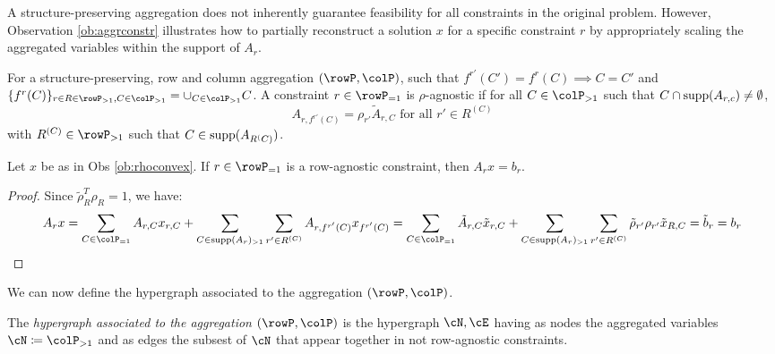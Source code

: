 {A structure-preserving aggregation does not inherently guarantee feasibility for all constraints in the original problem. However, Observation \ref{ob:aggrconstr} illustrates how to partially reconstruct a solution \(x\) for a specific constraint \(r\) by appropriately scaling the aggregated variables within the support of \(A_r\). 

\begin{definition}
  For a structure-preserving, row and column aggregation \((\rowP,\colP)\), such that \(f^{r'}(C') = f^r(C) \implies C=C'\) and \\ \(\{f^r(C)\}_{r\in R \in \rowP_{>1}, C \in \colP_{>1}} = \cup_{C \in \colP_{>1}}C\).
  A constraint \(r \in \rowP_{=1}\) is \(\rho\)-agnostic if for all \(C \in \colP_{>1}\) such that \(C \cap \operatorname{supp}(A_{r,c}) \neq \emptyset\), 
  \[A_{r,f^{r'}(C)} = \rho_{r'}\tilde{A}_{r,C} \text{ for all } r' \in R^{(C)} \]
   with \(R^{(C)} \in \rowP_{>1}\) such that \(C \in \operatorname{supp}(A_{R^(C)})\).
\end{definition}
\begin{observation}
 Let \(x\) be as in Obs \ref{ob:rhoconvex}. If \(r \in \rowP_{=1}\) is a row-agnostic constraint, then \(A_rx=b_r\).
\end{observation}

\begin{proof}
Since \(\tilde{\rho}_R^T \rho_R = 1\), we have:
  \[
  A_rx = \sum_{C \in \colP_{=1}}A_{r,C}x_{r,C} +  \sum_{C \in \supp(A_{r})_{>1}} \sum_{r' \in R^{(C)}} A_{r,f^{r'}(C)}x_{f^{r'}(C)} = \sum_{C \in \colP_{=1}}\tilde{A}_{r,C}\tilde{x}_{r,C} +  \sum_{C \in \supp(A_{r})_{>1}} \sum_{r' \in R^{(C)}}\tilde{\rho}_{r'} \rho_{r'}\tilde{x}_{R,C} = \tilde{b}_r = b_r
   \]
\end{proof}

We can now define the hypergraph associated to the aggregation \((\rowP, \colP)\).
\begin{definition}
  The \emph{hypergraph associated to the aggregation \((\rowP, \colP)\)} is the hypergraph \(\cN, \cE\) having as nodes the aggregated variables \(\cN \coloneqq \colP_{>1}\) and as edges the subsest of \(\cN\) that appear together in not row-agnostic constraints.
\end{definition}

}
